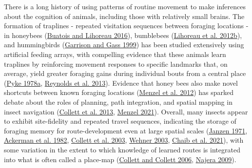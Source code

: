 \documentclass[twoside,12pt,final]{ucthesis-CA2012}
\begin{document}
\begin{ucmainmatter}
There is a long history of using patterns of routine movement to make inferences about the cognition of animals, including those with relatively small brains. The formation of traplines - repeated visitation sequences between foraging locations - in honeybees (\protect\hyperlink{ref-buatois2016}{Buatois and Lihoreau 2016}), bumblebees (\protect\hyperlink{ref-lihoreau2012}{Lihoreau et al. 2012b}), and hummingbirds (\protect\hyperlink{ref-garrison1999}{Garrison and Gass 1999}) has been studied extensively using artificial feeding arrays, with compelling evidence that these animals learn traplines by reinforcing movement responses to specific landmarks that, on average, yield greater foraging gains during individual bouts from a central place (\protect\hyperlink{ref-pyke1978}{Pyke 1978a}, \protect\hyperlink{ref-reynolds2013}{Reynolds et al. 2013}). Evidence that honey bees also make novel shortcuts between known foraging locations (\protect\hyperlink{ref-menzel2012}{Menzel et al. 2012}) has sparked debate about the roles of planning, path integration, and spatial mapping in insect navigation (\protect\hyperlink{ref-collett2013}{Collett et al. 2013}, \protect\hyperlink{ref-menzel2021}{Menzel 2021}). Overall, many insects appear to exhibit site-fidelity and repeated travel sequences, indicating the storage of foraging memory for route-development even at large spatial scales (\protect\hyperlink{ref-janzen1971}{Janzen 1971}, \protect\hyperlink{ref-ackerman1982}{Ackerman et al. 1982}, \protect\hyperlink{ref-collett2003}{Collett et al. 2003}, \protect\hyperlink{ref-wehner2003}{Wehner 2003}, \protect\hyperlink{ref-chaib2021}{Chaib et al. 2021}), with some variation in the extent to which knowledge of learned routes is integrated into what is often called a place-map (\protect\hyperlink{ref-collett2006}{Collett and Collett 2006}, \protect\hyperlink{ref-najera2009}{Najera 2009}).


\end{ucmainmatter}
\end{document}
